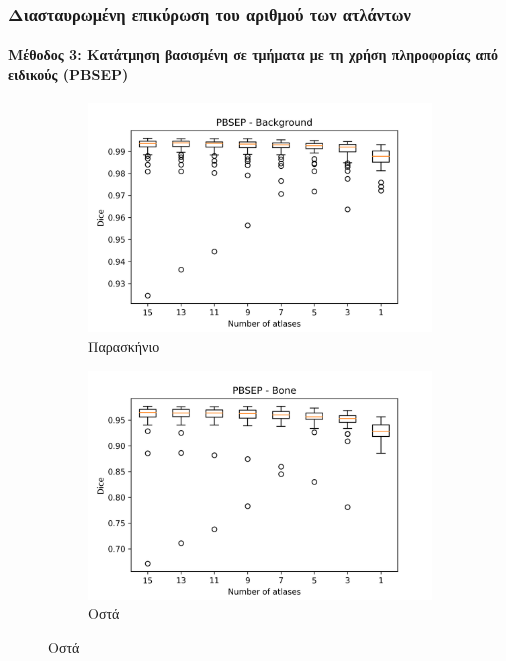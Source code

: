 \documentclass{beamer}
\begin{document}
\begin{frame}
\frametitle{Διασταυρωμένη επικύρωση του αριθμού των ατλάντων}
\framesubtitle{Μέθοδος 3: Κατάτμηση βασισμένη σε τμήματα με τη χρήση πληροφορίας
από ειδικούς (PBSEP)}

\begin{figure}[H]
    \centering

    \begin{subfigure}[b]{0.42\linewidth}
    \includegraphics[width=\linewidth]{PBSEP_Number_of_atlases_Background_plot.png}
    \caption{Παρασκήνιο}
    \end{subfigure}
    \begin{subfigure}[b]{0.42\linewidth}
    \includegraphics[width=\linewidth]{PBSEP_Number_of_atlases_Bone_plot.png}
    \caption{Οστά}
    \end{subfigure}


\end{figure}
\end{frame}
\end{document}
